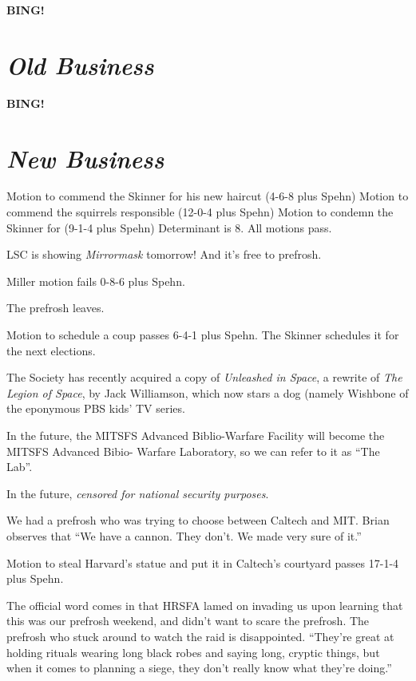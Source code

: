 \documentclass[10pt]{article}
\newcommand{\bing}{{\bf BING!} }
\newcommand{\goto}[1]{\bing \vskip 12pt \section*{{\em{#1}}}}
\newcommand{\ps}{ plus Spehn\xspace}
\begin{document}



\goto{Old Business}

\goto{New Business}

Motion to commend the Skinner for his new haircut (4-6-8\ps)
Motion to commend the squirrels responsible (12-0-4\ps)
Motion to condemn the Skinner for (9-1-4\ps)
Determinant is 8.  All motions pass.

LSC is showing \emph{Mirrormask} tomorrow!  And it's free to prefrosh.

Miller motion fails 0-8-6\ps.

The prefrosh leaves.

Motion to schedule a coup passes 6-4-1\ps.  The Skinner schedules it for the next elections.

The Society has recently acquired a copy of \emph{Unleashed in Space}, a rewrite of \emph{The Legion
of Space}, by Jack Williamson, which now stars a dog (namely Wishbone of the eponymous PBS kids' TV series.

In the future, the MITSFS Advanced Biblio-Warfare Facility will become the MITSFS Advanced Bibio-
Warfare Laboratory, so we can refer to it as ``The Lab''.

In the future, \emph{censored for national security purposes}.

We had a prefrosh who was trying to choose between Caltech and MIT.  Brian observes that ``We have 
a cannon.  They don't.  We made very sure of it.''

Motion to steal Harvard's statue and put it in Caltech's courtyard passes 17-1-4\ps.

The official word comes in that HRSFA lamed on invading us upon learning that this was our prefrosh
weekend, and didn't want to scare the prefrosh.  The prefrosh who stuck around to watch the raid is
disappointed.
``They're great at holding rituals wearing long black robes and saying long, cryptic things, but 
when it comes to planning a siege, they don't really know what they're doing.''  
\end{document}
